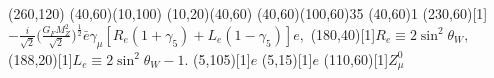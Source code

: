 \begin{axopicture}(260,120)
	\Line[arrow](40,60)(10,100)
	\Line[arrow](10,20)(40,60)
	\Photon(40,60)(100,60){3}{5}
	\Vertex(40,60){1}
	\Text(230,60)[1]{$-\frac{i}{\sqrt{2}}\big(\frac{G_FM_Z^2}{\sqrt{2}}\big)^{\frac{1}{2}}\bar{e}\gamma_\mu[R_e(1+\gamma_5)+L_e(1-\gamma_5)]e,$}
	\Text(180,40)[1]{$R_e\equiv2\sin^2\theta_W,$}
	\Text(188,20)[1]{$L_e\equiv2\sin^2\theta_W-1.$}
	\Text(5,105)[1]{$e$}
	\Text(5,15)[1]{$e$}
	\Text(110,60)[1]{$Z^0_\mu$}
\end{axopicture}